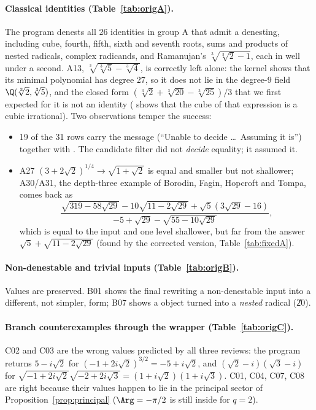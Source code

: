 \paragraph{Classical identities (Table~\ref{tab:origA}).}
The program denests all 26 identities in group A that admit a denesting,
including cube, fourth, fifth, sixth and seventh roots, sums and products of
nested radicals, complex radicands, and Ramanujan's $\sqrt[3]{\sqrt[3]2-1}$,
each in well under a second. A13, $\sqrt[3]{\sqrt[3]5-\sqrt[3]4}$, is correctly
left alone: the kernel shows that its minimal polynomial has degree 27, so it
does not lie in the degree-9 field $\Q(\sqrt[3]2,\sqrt[3]5)$, and the closed
form $(\sqrt[3]2+\sqrt[3]{20}-\sqrt[3]{25})/3$ that we first expected for it is
not an identity ( shows that the cube of that expression is a
cubic irrational). Two observations temper the success:
\begin{itemize}
\item 19 of the 31 rows carry the message 
      (``Unable to decide \ldots\ Assuming it is'') together with
      . The candidate filter did not \emph{decide} equality; it
      assumed it.
\item A27 $(3+2\sqrt2)^{1/4}\to\sqrt{1+\sqrt2}$ is equal and smaller but not
      shallower; A30/A31, the depth-three example of Borodin, Fagin, Hopcroft
      and Tompa, comes back as
      \[
      \frac{\sqrt{319-58\sqrt{29}}-10\sqrt{11-2\sqrt{29}}+\sqrt5(3\sqrt{29}-16)}
           {-5+\sqrt{29}-\sqrt{55-10\sqrt{29}}},
      \]
      which is equal to the input and one level shallower, but far from the
      answer $\sqrt5+\sqrt{11-2\sqrt{29}}$ (found by the corrected version,
      Table~\ref{tab:fixedA}).
\end{itemize}


\paragraph{Non-denestable and trivial inputs (Table~\ref{tab:origB}).}
Values are preserved. B01 shows the final  rewriting a
non-denestable input into a different, not simpler, form; B07 shows a
 object turned into a \emph{nested} radical (\U{20}).


\paragraph{Branch counterexamples through the wrapper (Table~\ref{tab:origC}).}
C02 and C03 are the wrong values predicted by all three reviews: the program
returns $5-i\sqrt2$ for $(-1+2i\sqrt2)^{3/2}=-5+i\sqrt2$, and
$(\sqrt2-i)(\sqrt3-i)$ for $\sqrt{-1+2i\sqrt2}\sqrt{-2+2i\sqrt3}=(1+i\sqrt2)(1+i\sqrt3)$.
C01, C04, C07, C08 are right because their values happen to lie in the
principal sector of Proposition~\ref{prop:principal}
($\Arg=-\pi/2$ is still inside for $q=2$).


